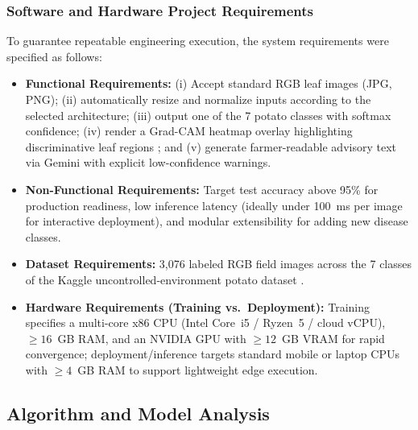 \subsubsection{Software and Hardware Project Requirements}
To guarantee repeatable engineering execution, the system requirements were specified as follows:
\begin{itemize}
    \item \textbf{Functional Requirements:} (i) Accept standard RGB leaf images (JPG, PNG); (ii) automatically resize and normalize inputs according to the selected architecture; (iii) output one of the 7 potato classes with softmax confidence; (iv) render a Grad-CAM heatmap overlay highlighting discriminative leaf regions \cite{selvaraju2017grad}; and (v) generate farmer-readable advisory text via Gemini with explicit low-confidence warnings.
    \item \textbf{Non-Functional Requirements:} Target test accuracy above 95\% for production readiness, low inference latency (ideally under 100~ms per image for interactive deployment), and modular extensibility for adding new disease classes.
    \item \textbf{Dataset Requirements:} 3,076 labeled RGB field images across the 7 classes of the Kaggle uncontrolled-environment potato dataset \cite{shabrina2024novel}.
    \item \textbf{Hardware Requirements (Training vs.\ Deployment):} Training specifies a multi-core x86 CPU (Intel Core~i5 / Ryzen~5 / cloud vCPU), $\ge 16$~GB RAM, and an NVIDIA GPU with $\ge 12$~GB VRAM for rapid convergence; deployment/inference targets standard mobile or laptop CPUs with $\ge 4$~GB RAM to support lightweight edge execution.
\end{itemize}

\subsection{Algorithm and Model Analysis}

